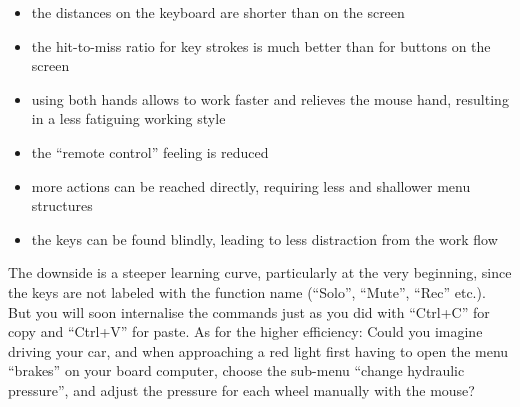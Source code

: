 \begin{itemize}
 \item the distances on the keyboard are shorter than on the screen
 \item the hit-to-miss ratio for key strokes is much better than for buttons on the screen
 \item using both hands allows to work faster and relieves the mouse hand, resulting in a less fatiguing working style
 \item the ``remote control'' feeling is reduced
 \item more actions can be reached directly, requiring less and shallower menu structures
 \item the keys can be found blindly, leading to less distraction from the work flow
\end{itemize}

The downside is a steeper learning curve, particularly at the very beginning, since the keys are not labeled with the function name (``Solo'', ``Mute'', ``Rec'' etc.). But you will soon internalise the commands just as you did with ``Ctrl+C'' for copy and ``Ctrl+V'' for paste. As for the higher efficiency: Could you imagine driving your car, and when approaching a red light first having to open the menu ``brakes'' on your board computer, choose the sub-menu ``change hydraulic pressure'', and adjust the pressure for each wheel manually with the mouse?

